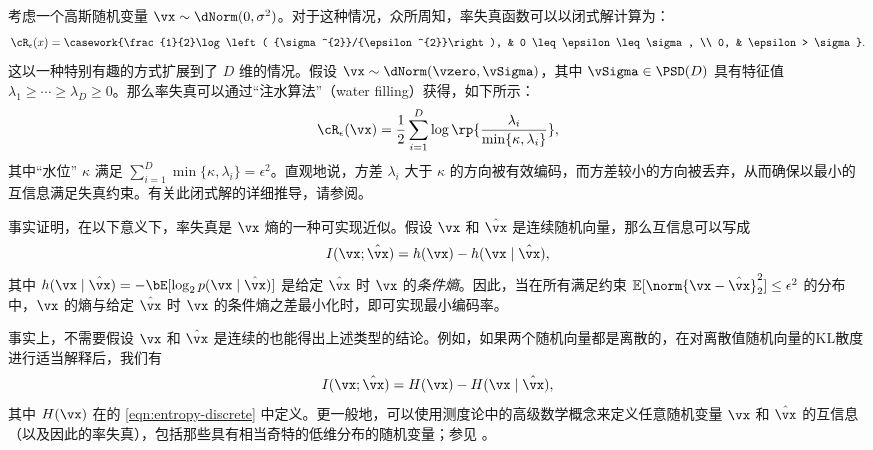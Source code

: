 \documentclass[../../book-main_zh.tex]{subfiles}
\begin{document}
\begin{example}\label{ex:gaussian_rate_distortion}
    考虑一个高斯随机变量 \(\vx \sim \dNorm(0, \sigma^{2})\)。对于这种情况，众所周知，率失真函数可以以闭式解计算为：
    \begin{equation}
        \cR_{\epsilon}(x) =
        \casework{\frac{1}{2}\log\left(
            {\sigma^{2}}/{\epsilon^{2}}\right), & 0 \leq
        \epsilon \leq \sigma, \\ 0, & \epsilon > \sigma}.
    \end{equation}
    这以一种特别有趣的方式扩展到了 \(D\) 维的情况。假设 \(\vx \sim \dNorm(\vzero, \vSigma)\)，其中 \(\vSigma \in \PSD(D)\) 具有特征值 \(\lambda_{1} \geq \cdots \geq \lambda_{D} \geq 0\)。那么率失真可以通过“注水算法”（water filling）获得，如下所示：
    \begin{equation}
        \cR_{\epsilon}(\vx) = \frac{1}{2} \sum_{i =
        1}^{D}\log\rp{\frac{\lambda_{i}}{\min\{\kappa, \lambda_{i}\}}},
    \end{equation}
    其中“水位” \(\kappa\) 满足 \(\sum_{i = 1}^{D}\min\{\kappa, \lambda_{i}\} = \epsilon^{2}\)。直观地说，方差 \(\lambda_{i}\) 大于 \(\kappa\) 的方向被有效编码，而方差较小的方向被丢弃，从而确保以最小的互信息满足失真约束。有关此闭式解的详细推导，请参阅。
\end{example}

\begin{remark}
    事实证明，在以下意义下，率失真是 $\vx$ 熵的一种可实现近似。假设 $\vx$ 和 $\hat{\vx}$ 是连续随机向量，那么互信息可以写成
    \begin{equation}\label{eq:information-entropy}
        I(\vx; \hat\vx) = h(\vx) - h(\vx \mid \hat \vx),
    \end{equation}
    其中 $h(\vx \mid \hat \vx) = -\bE[\log_2 p(\vx \mid \hat\vx)]$ 是给定 $\hat \vx$ 时 $\vx$ 的\textit{条件熵}。因此，当在所有满足约束 $\mathbb{E} [\norm{\vx- \hat \vx}_2^2] \le \epsilon^2$ 的分布中，$\vx$ 的熵与给定 $\hat \vx$ 时 $\vx$ 的条件熵之差最小化时，即可实现最小编码率。

    事实上，不需要假设 $\vx$ 和 $\hat \vx$ 是连续的也能得出上述类型的结论。例如，如果两个随机向量都是离散的，在对离散值随机向量的KL散度进行适当解释后，我们有
    \begin{equation}\label{eq:mutual}
        I(\vx; \hat\vx) = H(\vx) - H(\vx \mid \hat \vx),
    \end{equation}
    其中 $H(\vx)$ 在的 \eqref{eqn:entropy-discrete} 中定义。更一般地，可以使用测度论中的高级数学概念来定义任意随机变量 $\vx$ 和 $\hat \vx$ 的互信息（以及因此的率失真），包括那些具有相当奇特的低维分布的随机变量；参见 \textcite[\S 8.5]{Cover-Thomas}。
\end{remark}
\end{document}
